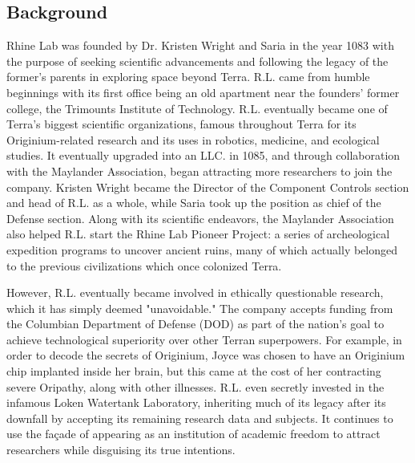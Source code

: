 \documentclass[12pt]{article}
\begin{document}
\begin{multicols}{2}

\section{Background}
    Rhine Lab was founded by Dr. Kristen Wright and Saria in the year 1083 with the purpose of seeking scientific advancements and following the legacy of the former's parents in exploring space beyond Terra. R.L. came from humble beginnings with its first office being an old apartment near the founders' former college, the Trimounts Institute of Technology.\cite{1} R.L. eventually became one of Terra's biggest scientific organizations, famous throughout Terra for its Originium-related research and its uses in robotics, medicine, and ecological studies. It eventually upgraded into an LLC. in 1085, and through collaboration with the Maylander Association, began attracting more researchers to join the company. Kristen Wright became the Director of the Component Controls section and head of R.L. as a whole, while Saria took up the position as chief of the Defense section. Along with its scientific endeavors, the Maylander Association also helped R.L. start the Rhine Lab Pioneer Project: a series of archeological expedition programs to uncover ancient ruins, many of which actually belonged to the previous civilizations which once colonized Terra.

    However, R.L. eventually became involved in ethically questionable research, which it has simply deemed "unavoidable." The company accepts funding from the Columbian Department of Defense (DOD) as part of the nation's goal to achieve technological superiority over other Terran superpowers. For example, in order to decode the secrets of Originium, Joyce was chosen to have an Originium chip implanted inside her brain, but this came at the cost of her contracting severe Oripathy, along with other illnesses.\cite{2} R.L. even secretly invested in the infamous Loken Watertank Laboratory, inheriting much of its legacy after its downfall by accepting its remaining research data and subjects.\cite{3} It continues to use the façade of appearing as an institution of academic freedom to attract researchers while disguising its true intentions.


\end{multicols}
\end{document}
